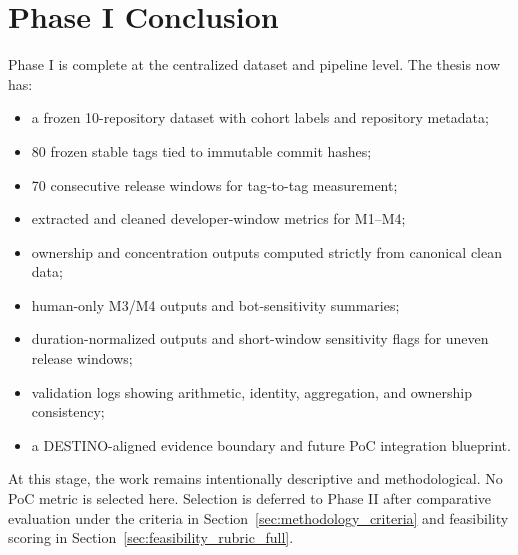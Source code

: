 \section{Phase I Conclusion}
\label{sec:phase1_conclusion}

Phase I is complete at the centralized dataset and pipeline level. The thesis now has:
\begin{itemize}[leftmargin=*]
  \item a frozen 10-repository dataset with cohort labels and repository metadata;
  \item 80 frozen stable tags tied to immutable commit hashes;
  \item 70 consecutive release windows for tag-to-tag measurement;
  \item extracted and cleaned developer-window metrics for M1--M4;
  \item ownership and concentration outputs computed strictly from canonical clean data;
  \item human-only M3/M4 outputs and bot-sensitivity summaries;
  \item duration-normalized outputs and short-window sensitivity flags for uneven release windows;
  \item validation logs showing arithmetic, identity, aggregation, and ownership consistency;
  \item a DESTINO-aligned evidence boundary and future PoC integration blueprint.
\end{itemize}

At this stage, the work remains intentionally descriptive and methodological. No PoC metric is selected here.
Selection is deferred to Phase II after comparative evaluation under the criteria in
Section~\ref{sec:methodology_criteria} and feasibility scoring in Section~\ref{sec:feasibility_rubric_full}.
